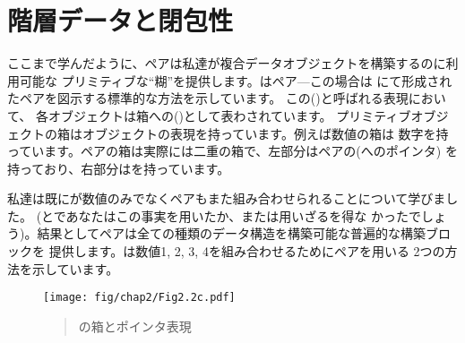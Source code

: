 \section{階層データと閉包性}
\label{Section 2.2}



ここまで学んだように、ペアは私達が複合データオブジェクトを構築するのに利用可能な
プリミティブな``糊''を提供します。はペア---この場合は
にて形成されたペアを図示する標準的な方法を示しています。
この()と呼ばれる表現において、
各オブジェクトは箱への()として表わされています。
プリミティブオブジェクトの箱はオブジェクトの表現を持っています。例えば数値の箱は
数字を持っています。ペアの箱は実際には二重の箱で、左部分はペアの(へのポインタ)
を持っており、右部分はを持っています。




私達は既にが数値のみでなくペアもまた組み合わせられることについて学びました。
(とであなたはこの事実を用いたか、または用いざるを得な
かったでしょう)。結果としてペアは全ての種類のデータ構造を構築可能な普遍的な構築ブロックを
提供します。は数値1, 2, 3, 4を組み合わせるためにペアを用いる
2つの方法を示しています。

\begin{figure}[tb]
\label{Figure 2.2}
\centering
\begin{comment}
\heading{Figure 2.2:} Box-and-pointer representation of \code{(cons 1 2)}.

\begin{example}
     +---+---+     +---+
---->| * | *-+---->| 2 |
     +-|-+---+     +---+
       |
       V
     +---+
     | 1 |
     +---+
\end{example}
\end{comment}
\texttt{[image: fig/chap2/Fig2.2c.pdf]}
\begin{quote}
 の箱とポインタ表現
\end{quote}
\end{figure}

